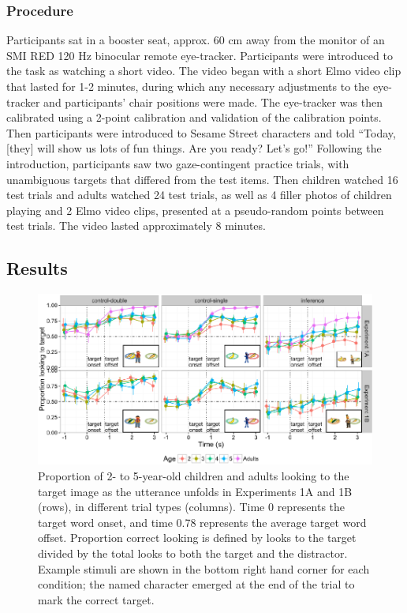 \documentclass[a4paper,man,apacite,floatsintext]{apa6}
\newenvironment{CodeChunk}{}{}
\begin{document}
\subsubsection{Procedure}\label{procedure}

Participants sat in a booster seat, approx. 60 cm away from the monitor
of an SMI RED 120 Hz binocular remote eye-tracker. Participants were
introduced to the task as watching a short video. The video began with a
short Elmo video clip that lasted for 1-2 minutes, during which any
necessary adjustments to the eye-tracker and participants' chair
positions were made. The eye-tracker was then calibrated using a 2-point
calibration and validation of the calibration points. Then participants
were introduced to Sesame Street characters and told ``Today, {[}they{]}
will show us lots of fun things. Are you ready? Let's go!'' Following
the introduction, participants saw two gaze-contingent practice trials,
with unambiguous targets that differed from the test items. Then
children watched 16 test trials and adults watched 24 test trials, as
well as 4 filler photos of children playing and 2 Elmo video clips,
presented at a pseudo-random points between test trials. The video
lasted approximately 8 minutes.

\subsection{Results}\label{results}

\begin{CodeChunk}
\begin{figure}[H]

{\centering \includegraphics{figs/et_accuracy-1} 

}

\caption[Proportion of 2- to 5-year-old children and adults looking to the target image as the utterance unfolds in Experiments 1A and 1B (rows), in different trial types (columns)]{Proportion of 2- to 5-year-old children and adults looking to the target image as the utterance unfolds in Experiments 1A and 1B (rows), in different trial types (columns). Time 0 represents the target word onset, and time 0.78 represents the average target word offset. Proportion correct looking is defined by looks to the target divided by the total looks to both the target and the distractor. Example stimuli are shown in the bottom right hand corner for each condition; the named character emerged at the end of the trial to mark the correct target.}\label{fig:et_accuracy}
\end{figure}
\end{CodeChunk}
\end{document}
